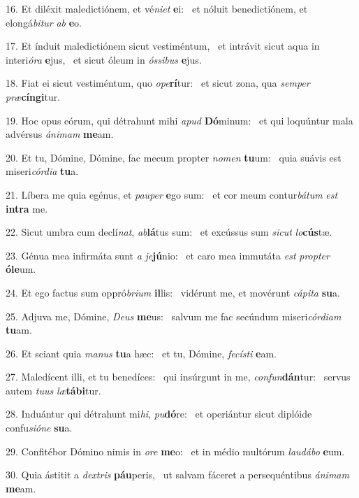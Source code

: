 16. Et diléxit maledictiónem, et vé\textit{ni}\textit{et} \textbf{e}i: \ast\  et nóluit benedictiónem, et elongá\textit{bi}\textit{tur} \textit{ab} \textbf{e}o.\

17. Et índuit maledictiónem sicut vestiméntum, \dag\  et intrávit sicut aqua in interi\textit{ó}\textit{ra} \textbf{e}jus, \ast\  et sicut óleum in \textit{ós}\textit{si}\textit{bus} \textbf{e}jus.\

18. Fiat ei sicut vestiméntum, quo \textit{o}\textit{pe}\textbf{rí}tur: \ast\  et sicut zona, qua \textit{sem}\textit{per} \textit{præ}\textbf{cín}\textbf{gi}tur.\

19. Hoc opus eórum, qui détrahunt mihi \textit{a}\textit{pud} \textbf{Dó}minum: \ast\  et qui loquúntur mala advérsus \textit{á}\textit{ni}\textit{mam} \textbf{me}am.\

20. Et tu, Dómine, Dómine, fac mecum propter \textit{no}\textit{men} \textbf{tu}um: \ast\  quia suávis est miseri\textit{cór}\textit{di}\textit{a} \textbf{tu}a.\

21. Líbera me quia egénus, et \textit{pau}\textit{per} \textbf{e}go sum: \ast\  et cor meum contur\textit{bá}\textit{tum} \textit{est} \textbf{in}\textbf{tra} me.\

22. Sicut umbra cum declí\textit{nat}, \textit{ab}\textbf{lá}tus sum: \ast\  et excússus sum \textit{sic}\textit{ut} \textit{lo}\textbf{cús}tæ.\

23. Génua mea infirmáta sunt \textit{a} \textit{je}\textbf{jú}nio: \ast\  et caro mea immutáta \textit{est} \textit{prop}\textit{ter} \textbf{ó}\textbf{le}um.\

24. Et ego factus sum oppró\textit{bri}\textit{um} \textbf{il}lis: \ast\  vidérunt me, et movérunt \textit{cá}\textit{pi}\textit{ta} \textbf{su}a.\

25. Adjuva me, Dómine, \textit{De}\textit{us} \textbf{me}us: \ast\  salvum me fac secúndum miseri\textit{cór}\textit{di}\textit{am} \textbf{tu}am.\

26. Et sciant quia \textit{ma}\textit{nus} \textbf{tu}a hæc: \ast\  et tu, Dómine, \textit{fe}\textit{cís}\textit{ti} \textbf{e}am.\

27. Maledícent illi, et tu benedíces: \dag\  qui insúrgunt in me, \textit{con}\textit{fun}\textbf{dán}tur: \ast\  servus autem \textit{tu}\textit{us} \textit{læ}\textbf{tá}\textbf{bi}tur.\

28. Induántur qui détrahunt mi\textit{hi}, \textit{pu}\textbf{dó}re: \ast\  et operiántur sicut diplóide confu\textit{si}\textit{ó}\textit{ne} \textbf{su}a.\

29. Confitébor Dómino nimis in \textit{o}\textit{re} \textbf{me}o: \ast\  et in médio multórum \textit{lau}\textit{dá}\textit{bo} \textbf{e}um.\

30. Quia ástitit a \textit{dex}\textit{tris} \textbf{páu}peris, \ast\  ut salvam fáceret a persequéntibus \textit{á}\textit{ni}\textit{mam} \textbf{me}am.\


